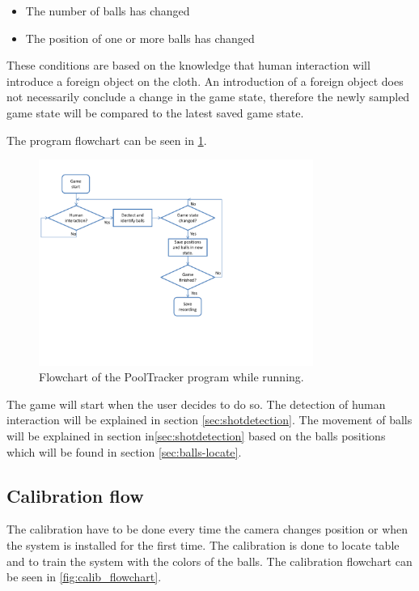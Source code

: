 \begin{itemize}
	\item The number of balls has changed
	\item The position of one or more balls has changed
\end{itemize}

These conditions are based on the knowledge that human interaction will introduce a foreign object on the cloth.  An introduction of a foreign object does not necessarily conclude a change in the game state, therefore the newly sampled game state will be compared to the latest saved game state.

The program flowchart can be seen in \ref{fig:program_flowchart}.\\

\begin{figure}[H]
\begin{center}
\leavevmode
\includegraphics[width=0.8\textwidth]{images/program_flowchart}
\end{center}
\caption{Flowchart of the PoolTracker program while running.}
\label{fig:program_flowchart}
\end{figure}

The game will start when the user decides to do so. The detection of human interaction will be explained in section \ref{sec:shotdetection}. The movement of balls will be explained in section in\ref{sec:shotdetection} based on the balls positions which will be found in section \ref{sec:balls-locate}.

\subsection{Calibration flow}
The calibration have to be done every time the camera changes position or when the system is installed for the first time. The calibration is done to locate table and to train the system with the colors of the balls. The calibration flowchart can be seen in \ref{fig:calib_flowchart}.\\

